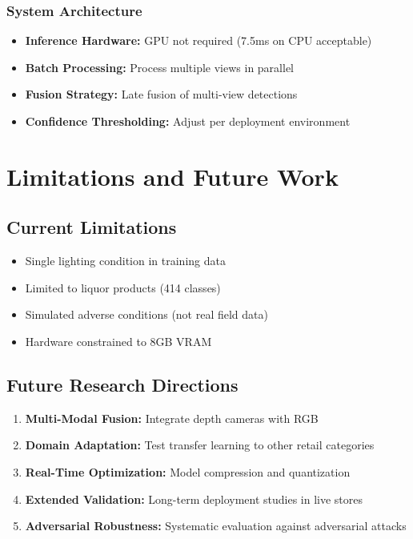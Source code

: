 \documentclass[conference]{IEEEtran}
\begin{document}
\subsubsection{System Architecture}
\begin{itemize}
    \item \textbf{Inference Hardware:} GPU not required (7.5ms on CPU acceptable)
    \item \textbf{Batch Processing:} Process multiple views in parallel
    \item \textbf{Fusion Strategy:} Late fusion of multi-view detections
    \item \textbf{Confidence Thresholding:} Adjust per deployment environment
\end{itemize}

\section{Limitations and Future Work}

\subsection{Current Limitations}
\begin{itemize}
    \item Single lighting condition in training data
    \item Limited to liquor products (414 classes)
    \item Simulated adverse conditions (not real field data)
    \item Hardware constrained to 8GB VRAM
\end{itemize}

\subsection{Future Research Directions}
\begin{enumerate}
    \item \textbf{Multi-Modal Fusion:} Integrate depth cameras with RGB
    \item \textbf{Domain Adaptation:} Test transfer learning to other retail categories
    \item \textbf{Real-Time Optimization:} Model compression and quantization
    \item \textbf{Extended Validation:} Long-term deployment studies in live stores
    \item \textbf{Adversarial Robustness:} Systematic evaluation against adversarial attacks
\end{enumerate}
\end{document}
